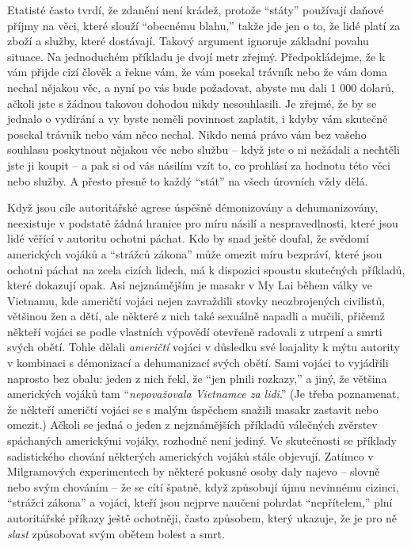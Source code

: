 \documentclass{book}
\begin{document}
Etatisté často tvrdí, že zdanění není krádež, protože \enquote{státy} používají daňové příjmy na věci, které slouží \enquote{obecnému blahu,} takže jde jen o to, že lidé platí za zboží a služby, které dostávají. Takový argument ignoruje základní povahu situace. Na jednoduchém příkladu je dvojí metr zřejmý. Předpokládejme, že k vám přijde cizí člověk a řekne vám, že vám posekal trávník nebo že vám doma nechal nějakou věc, a nyní po vás bude požadovat, abyste mu dali 1 000 dolarů, ačkoli jste s žádnou takovou dohodou nikdy nesouhlasili. Je zřejmé, že by se jednalo o vydírání a vy byste neměli povinnost zaplatit, i kdyby vám skutečně posekal trávník nebo vám něco nechal. Nikdo nemá právo vám bez vašeho souhlasu poskytnout nějakou věc nebo službu -- když jste o ni nežádali a nechtěli jste ji koupit -- a pak si od vás násilím vzít to, co prohlásí za hodnotu této věci nebo služby. A přesto přesně to každý \enquote{stát} na všech úrovních vždy dělá.

Když jsou cíle autoritářské agrese úspěšně démonizovány a dehumanizovány, neexistuje v podstatě žádná hranice pro míru násilí a nespravedlnosti, které jsou lidé věřící v autoritu ochotni páchat. Kdo by snad ještě doufal, že svědomí amerických vojáků a \enquote{strážců zákona} může omezit míru bezpráví, které jsou ochotni páchat na zcela cizích lidech, má k dispozici spoustu skutečných příkladů, které dokazují opak. Asi nejznámějším je masakr v My Lai během války ve Vietnamu, kde američtí vojáci nejen zavraždili stovky neozbrojených civilistů, většinou žen a dětí, ale některé z nich také sexuálně napadli a mučili, přičemž někteří vojáci se podle vlastních výpovědí otevřeně radovali z utrpení a smrti svých obětí. Tohle dělali \emph{američtí} vojáci v důsledku své loajality k mýtu autority v kombinaci s démonizací a dehumanizací svých obětí. Sami vojáci to vyjádřili naprosto bez obalu: jeden z nich řekl, že \enquote{jen plnili rozkazy,} a jiný, že většina amerických vojáků tam \enquote{\emph{nepovažovala Vietnamce za lidi}.} (Je třeba poznamenat, že někteří američtí vojáci se s malým úspěchem snažili masakr zastavit nebo omezit.) Ačkoli se jedná o jeden z nejznámějších příkladů válečných zvěrstev spáchaných americkými vojáky, rozhodně není jediný. Ve skutečnosti se příklady sadistického chování některých amerických vojáků stále objevují. Zatímco v Milgramových experimentech by některé pokusné osoby daly najevo -- slovně nebo svým chováním -- že se cítí špatně, když způsobují újmu nevinnému cizinci, \enquote{strážci zákona} a vojáci, kteří jsou nejprve naučeni pohrdat \enquote{nepřítelem,} plní autoritářské příkazy ještě ochotněji, často způsobem, který ukazuje, že je pro ně \emph{slast} způsobovat svým obětem bolest a smrt.
\end{document}
